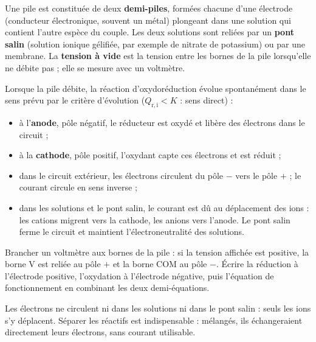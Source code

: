\begin{definition}
Une pile est constituée de deux \textbf{demi-piles}, formées chacune d'une électrode (conducteur électronique, souvent
un métal) plongeant dans une solution qui contient l'autre espèce du couple. Les deux solutions sont reliées par un
\textbf{pont salin} (solution ionique gélifiée, par exemple de nitrate de potassium) ou par une membrane. La
\textbf{tension à vide} est la tension entre les bornes de la pile lorsqu'elle ne débite pas ; elle se mesure avec un
voltmètre.
\end{definition}
\begin{propriete}
Lorsque la pile débite, la réaction d'oxydoréduction évolue spontanément dans le sens prévu par le critère d'évolution
($Q_{\mathrm{r},\mathrm{i}}<K$ : sens direct) :
\begin{itemize}[leftmargin=1.4em,itemsep=0.1em]
\item à l'\textbf{anode}, pôle négatif, le réducteur est oxydé et libère des électrons dans le circuit ;
\item à la \textbf{cathode}, pôle positif, l'oxydant capte ces électrons et est réduit ;
\item dans le circuit extérieur, les électrons circulent du pôle $-$ vers le pôle $+$ ; le courant circule en sens inverse ;
\item dans les solutions et le pont salin, le courant est dû au déplacement des ions : les cations migrent vers la
cathode, les anions vers l'anode. Le pont salin ferme le circuit et maintient l'électroneutralité des solutions.
\end{itemize}
\end{propriete}
\begin{savoirfaire}
Brancher un voltmètre aux bornes de la pile : si la tension affichée est positive, la borne V est reliée au pôle $+$ et la
borne COM au pôle $-$. Écrire la réduction à l'électrode positive, l'oxydation à l'électrode négative, puis l'équation de
fonctionnement en combinant les deux demi-équations.
\end{savoirfaire}
\begin{attention}
Les électrons ne circulent ni dans les solutions ni dans le pont salin : seuls les ions s'y déplacent. Séparer les
réactifs est indispensable : mélangés, ils échangeraient directement leurs électrons, sans courant utilisable.
\end{attention}
